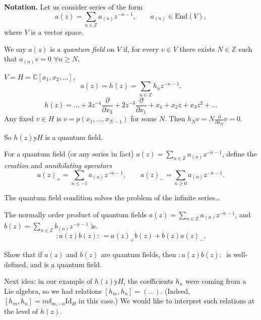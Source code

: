 \medskip\noindent
{\bf Notation.} Let us consider series of the form
$$
a(z)=\sum_{n \in \mathbb{Z}}a_{(n)}z^{-n-1},\qquad a_{(n)}\in \text{End}(V),
$$
where $V$ is a vector space.

\begin{definition}
\label{definition-quantum-field}
We say $a(z)$ is a {\it quantum field} on $V$ if,
for every $v \in V$ there exists $N \in \mathbb{Z}$ 
such that $a_{(n)}v=0$ $\forall  n\geq N$.
\end{definition}

\begin{example}
\label{example-quantum-field}
$V=H=\mathbb{C}[x_1,x_2,\ldots]$,
$$
a(z)=h(z)=\sum_{n \in \mathbb{Z}}h_n z^{-n-1}.
$$
$$
h(z)=\ldots+3z^{-4}\frac{\partial }{\partial x_3}
+2z^{-3}\frac{\partial }{\partial x_1}+x_1
+x_2z+x_3z^2+\ldots
$$
Any fixed $v \in H$ is $v=p(x_1,\ldots,x_{N-1})$ for some $N$.
Then $h_Nv=N \frac{\partial }{\partial x_N}v=0$.

So $h(z) \mathbb{y} H$ is a quantum field.
\end{example}

\begin{definition}
\label{definition-creating-annihilating-operators}
For a quantum field
(or any series in fact) $a(z)=\sum_{ n \in \mathbb{Z}}a_{(n)}z^{-n-1}$,
define the {\it creation} and {\it annihilating operators}
$$
a(z)_+=\sum_{n \leq -1}a_{(n)}z^{-n-1},\qquad 
a(z)_-=\sum_{n \geq 0}a_{(n)}z^{-n-1}.
$$
\end{definition}

The quantum field condition solves the problem of the infinite series…

The normally order product of quantum fields 
$a(z)=\sum_{n \in \mathbb{Z}}a_{(n)}z^{-n-1}$, and
$b(z)=\sum_{n \in \mathbb{Z}}b_{(n)}z^{-n-1}$ is.
$$
:\!a(z)b(z)\!:\,=a(z)_+b(z)+b(z)a(z)_-.
$$

\begin{exercise}
\label{exercise-most-important}
Show that if $a(z)$ and $b(z)$ are quantum fields,
then $:\!a(z)b(z)\!:\,$ is well-defined, and is a quantum field.
\end{exercise}

\medskip\noindent
Next idea: in our example of $h(z) \mathbb{y} H$,
the coefficients $h_n$ were coming from a Lie algebra,
so we had relations
 $[h_m,h_n]=(\ldots)$.
(Indeed, $[h_m,h_n]=m \delta_{m,-n}\text{Id}_H$ in this case.)
We would like to interpret such relations at the level of $h(z)$.

